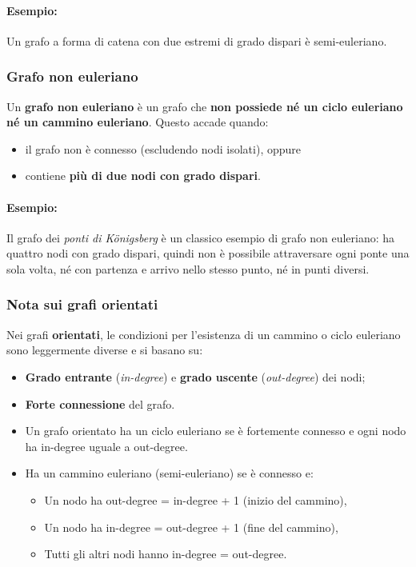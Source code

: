 \paragraph{Esempio:} Un grafo a forma di catena con due estremi di grado dispari è semi-euleriano.

\subsubsection*{Grafo non euleriano}

Un \textbf{grafo non euleriano} è un grafo che \textbf{non possiede né un ciclo euleriano né un cammino euleriano}. Questo accade quando:
\begin{itemize}
    \item il grafo non è connesso (escludendo nodi isolati), oppure
    \item contiene \textbf{più di due nodi con grado dispari}.
\end{itemize}

\paragraph{Esempio:} Il grafo dei \emph{ponti di Königsberg} è un classico esempio di grafo non euleriano: ha quattro nodi con grado dispari, quindi non è possibile attraversare ogni ponte una sola volta, né con partenza e arrivo nello stesso punto, né in punti diversi.

\subsubsection*{Nota sui grafi orientati}

Nei grafi \textbf{orientati}, le condizioni per l'esistenza di un cammino o ciclo euleriano sono leggermente diverse e si basano su:
\begin{itemize}
    \item \textbf{Grado entrante} (\emph{in-degree}) e \textbf{grado uscente} (\emph{out-degree}) dei nodi;
    \item \textbf{Forte connessione} del grafo.
\end{itemize}

\begin{itemize}
    \item Un grafo orientato ha un ciclo euleriano se è fortemente connesso e ogni nodo ha in-degree uguale a out-degree.
    \item Ha un cammino euleriano (semi-euleriano) se è connesso e:
    \begin{itemize}
        \item Un nodo ha out-degree = in-degree + 1 (inizio del cammino),
        \item Un nodo ha in-degree = out-degree + 1 (fine del cammino),
        \item Tutti gli altri nodi hanno in-degree = out-degree.
    \end{itemize}
\end{itemize}
\newpage
